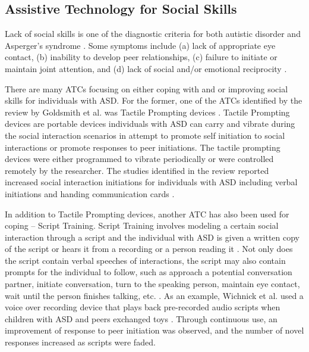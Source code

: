 \documentclass{ut-thesis}
\providecommand{\DIFaddtex}[1]{{\protect\color{blue}\uwave{#1}}} %
\providecommand{\DIFaddbegin}{} %
\providecommand{\DIFaddend}{} %
\providecommand{\DIFadd}[1]{\texorpdfstring{\DIFaddtex{#1}}{#1}} %
\begin{document}
\subsection{Assistive Technology for Social Skills}
Lack of social skills is one of the diagnostic criteria for both autistic disorder and Asperger's syndrome \cite{spitzer1980diagnostic}.  Some symptoms include (a) lack of appropriate eye contact, (b) inability to develop peer relationships, (c) failure to initiate or maintain joint attention, and (d) lack of social and/or emotional reciprocity \cite{rao2008social}.

There are many ATCs focusing on either coping with \DIFaddbegin \DIFadd{(i.e. teaching is not the primary objective) }\DIFaddend and or improving social skills for individuals with ASD.  For the former, one of the ATCs identified by the review by Goldsmith et al. was Tactile Prompting devices \cite{goldsmith2004use}.  Tactile Prompting devices are portable devices individuals with ASD can carry and vibrate during the social interaction scenarios in attempt to promote self initiation to social interactions or promote responses to peer initiations.  The tactile prompting devices were either programmed to vibrate periodically or were controlled remotely by the researcher.  The studies identified in the review reported increased social interaction initiations for individuals with ASD including verbal initiations \cite{shabani2002increasing, taylor1998teaching} and handing communication cards \cite{taylor2004teaching}.

In addition to Tactile Prompting devices, another ATC has also been used for coping -- Script Training.  Script Training involves modeling a certain social interaction through a script and the individual with ASD is given a written copy of the script or hears it from a recording or a person reading it \cite{stevenson2000social}.  Not only does the script contain verbal speeches of interactions, the script may also contain prompts for the individual to follow, such as approach a potential conversation partner, initiate conversation, turn to the speaking person, maintain eye contact, wait until the person finishes talking, etc. \cite{wichnick2010effect}.  As an example, Wichnick et al. used a voice over recording device that plays back pre-recorded audio scripts when children with ASD and peers exchanged toys \cite{wichnick2010effect}.  Through continuous use, an improvement of response to peer initiation was observed, and the number of novel responses increased as scripts were faded.
\end{document}
